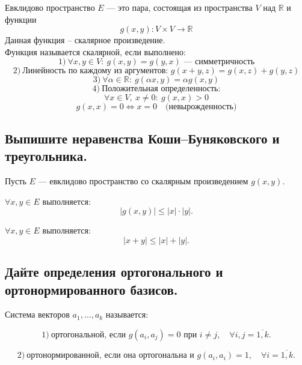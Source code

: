 \begin{definition}
    Евклидово пространство $E$ --- это пара, состоящая из пространства $V$ над $\mathbb{R}$
    и функции
    \[
        g(x, y): V \times V \to \mathbb{R}
    \]
    Данная функция -- скалярное произведение.
    \[
    \]
    Функция называется скалярной,
    если выполнено:
    \[
        1)\ \forall x, y \in V:\ g(x, y) = g(y, x) \text{ --- симметричность}
    \]
    \[
        2)\ \text{Линейность по каждому из аргументов: } g(x + y, z) = g(x, z) + g(y, z)
    \]
    \[
        3)\ \forall \alpha \in \mathbb{R}:\ g(\alpha x, y) = \alpha g(x, y)
    \]
    \[
        4)\ \text{Положительная определенность:}
    \]
    \[
        \forall x \in V,\ x \neq 0:\ g(x, x) > 0
    \]
    \[
        g(x, x) = 0 \Longleftrightarrow x = 0 \quad \text{(невырожденность)}
    \]
\end{definition}

\subsection{Выпишите неравенства Коши--Буняковского и треугольника.}

\begin{theorem}
Пусть $E$ --- евклидово пространство со скалярным произведением $g(x, y)$.

    $\forall x, y \in E$ выполняется:
    \[
        |g(x, y)| \leq |x| \cdot |y|.
    \]
\end{theorem}

\begin{definition}
    $\forall x, y \in E$ выполняется:
    \[
        |x + y| \leq |x| + |y|.
    \]
\end{definition}

\subsection{Дайте определения ортогонального и ортонормированного базисов.}

\begin{definition}
    Система векторов $a_1, \ldots, a_k$ называется:
    
    \[
        1)\ \text{ортогональной, если } g(a_i, a_j) = 0
        \text{ при } i \neq j,\quad \forall i, j = \overline{1, k}.
    \]
    
    \[
        2)\ \text{ортонормированной, если она ортогональна и }
        g(a_i, a_i) = 1,\quad \forall i = \overline{1, k}.
    \]
\end{definition}

